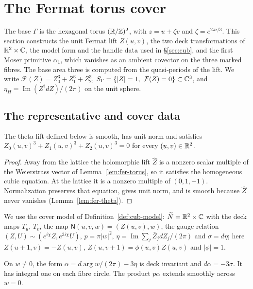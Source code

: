 \section{The Fermat torus cover}\label{sec:fer}

The base $\Gamma$ is the hexagonal torus $(\mathbb{R}/\mathbb{Z})^2$, with $z=u+\zeta v$ and $\zeta=e^{2\pi i/3}$.
This section constructs the unit Fermat lift $Z(u,v)$, the two deck transformations of $\mathbb{R}^2\times\mathbb{C}$, the model form and
the handle data used in \S\ref{sec:cub}, and the first Moser primitive $\alpha_1$, which vanishes as an ambient covector
on the three marked fibres. The base area three is computed from the quasi-periods of the lift.
We write $\mathcal F(Z)=Z_0^3+Z_1^3+Z_2^3$, $S_\Gamma=\{|Z|=1,\ \mathcal F(Z)=0\}\subset\mathbb{C}^3$, and
$\eta_H=\operatorname{Im}(Z^\dagger dZ)/(2\pi)$ on the unit sphere.

\subsection{The representative and cover data}\label{sec:fer-curve}

\begin{lemma}\label{lem:fer-curve}
The theta lift defined below is smooth, has unit norm and satisfies
$Z_0(u,v)^3+Z_1(u,v)^3+Z_2(u,v)^3=0$ for every $(u,v)\in\mathbb{R}^2$.
\end{lemma}

\begin{proof}
Away from the lattice the holomorphic lift $\hat Z$ is a nonzero scalar multiple of the Weierstrass vector of
Lemma~\ref{lem:fer-torus}, so it satisfies the homogeneous cubic equation.
At the lattice it is a nonzero multiple of $(0,1,-1)$.
Normalization preserves that equation, gives unit norm, and is smooth because $\hat Z$ never vanishes
(Lemma~\ref{lem:fer-theta}).
\end{proof}

We use the cover model of Definition~\ref{def:cub-model}: $\widetilde N=\mathbb{R}^2\times\mathbb{C}$ with the deck maps $T_u$, $T_v$, the
map $\mathsf N(u,v,w)=(Z(u,v),w)$, the gauge relation $(Z,U)\sim(e^{i\chi}Z,e^{3i\chi}U)$, $p=\pi|w|^2$,
$\eta=\operatorname{Im}\sum_j\bar Z_jdZ_j/(2\pi)$ and $\sigma=d\eta$; here $Z(u+1,v)=-Z(u,v)$, $Z(u,v+1)=\phi(u,v)Z(u,v)$ and
$|\phi|=1$.

\begin{lemma}\label{lem:fer-alpha}
On $w\ne0$, the form $\alpha=d\arg w/(2\pi)-3\eta$ is deck invariant and $d\alpha=-3\sigma$.
It has integral one on each fibre circle. The product $p\alpha$ extends smoothly across $w=0$.
\end{lemma}

